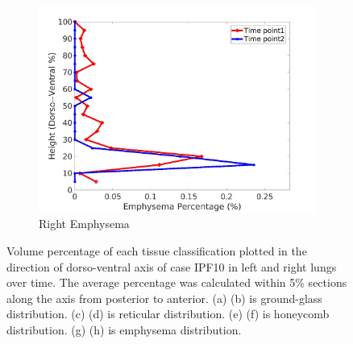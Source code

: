 \begin{figure}[H]
\begin{subfigure}{.42\linewidth}
  \includegraphics[width=\linewidth,trim={{.0\wd0} {.0\wd0} {.0\wd0} {.0\wd0}},clip]{Appendix/Image_AppexA/DorsoToVentral/IPF10RightLungEmphysemaDiseaseDorsoToVentral.jpg}
  \caption{Right Emphysema}
  \label{fig:IPF10DiseaseDorsoToVentral-h}
\end{subfigure}
\caption{Volume percentage of each tissue classification plotted in the direction of dorso-ventral axis of case IPF10 in left and right lungs over time. The average percentage was calculated within 5\% sections along the axis from posterior to anterior. (a) (b) is ground-glass distribution. (c) (d) is reticular distribution. (e) (f) is honeycomb distribution. (g) (h) is emphysema distribution.}
\label{fig:IPF10DiseaseDorsoToVentral}
\end{figure}

